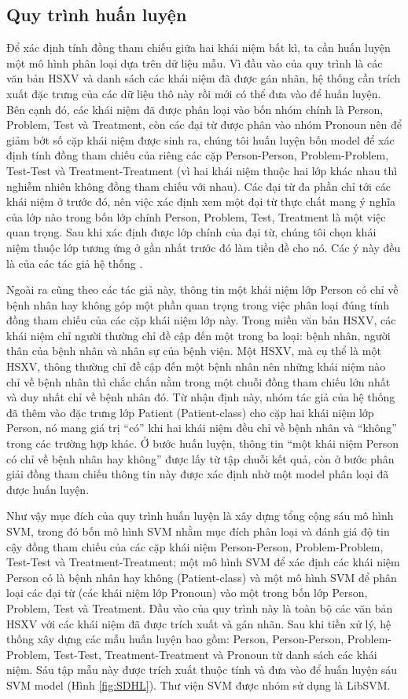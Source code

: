\subsection*{Quy trình huấn luyện}
Để xác định tính đồng tham chiếu giữa hai khái niệm bất kì, ta cần huấn luyện một mô hình phân loại dựa trên dữ liệu mẫu. Vì đầu vào của quy trình là các văn bản HSXV và danh sách các khái niệm đã được gán nhãn, hệ thống cần trích xuất đặc trưng của các dữ liệu thô này rồi mới có thể đưa vào để huấn luyện. Bên cạnh đó, các khái niệm đã được phân loại vào bốn nhóm chính là Person, Problem, Test và Treatment, còn các đại từ được phân vào nhóm Pronoun nên để giảm bớt số cặp khái niệm được sinh ra, chúng tôi huấn luyện bốn model để xác định tính đồng tham chiếu của riêng các cặp Person-Person, Problem-Problem, Test-Test và Treatment-Treatment (vì hai khái niệm thuộc hai lớp khác nhau thì nghiễm nhiên không đồng tham chiếu với nhau). Các đại từ đa phần chỉ tới các khái niệm ở trước đó, nên việc xác định xem một đại từ thực chất mang ý nghĩa của lớp nào trong bốn lớp chính Person, Problem, Test, Treatment là một việc quan trọng. Sau khi xác định được lớp chính của đại từ, chúng tôi chọn khái niệm thuộc lớp tương ứng ở gần nhất trước đó làm tiền đề cho nó. Các ý này đều là của các tác giả hệ thống \cite{YanXu2012}.

Ngoài ra cũng theo các tác giả này, thông tin một khái niệm lớp Person có chỉ về bệnh nhân hay không góp một phần quan trọng trong việc phân loại đúng tính đồng tham chiếu của các cặp khái niệm lớp này. Trong miền văn bản HSXV, các khái niệm chỉ người thường chỉ đề cập đến một trong ba loại: bệnh nhân, người thân của bệnh nhân và nhân sự của bệnh viện. Một HSXV, mà cụ thể là một HSXV, thông thường chỉ đề cập đến một bệnh nhân nên những khái niệm nào chỉ về bệnh nhân thì chắc chắn nằm trong một chuỗi đồng tham chiếu lớn nhất và duy nhất chỉ về bệnh nhân đó. Từ nhận định này, nhóm tác giả của hệ thống \cite{YanXu2012} đã thêm vào đặc trưng lớp Patient (Patient-class) cho cặp hai khái niệm lớp Person, nó mang giá trị ``có'' khi hai khái niệm đều chỉ về bệnh nhân và ``không'' trong các trường hợp khác. Ở bước huấn luyện, thông tin ``một khái niệm Person có chỉ về bệnh nhân hay không'' được lấy từ tập chuỗi kết quả, còn ở bước phân giải đồng tham chiếu thông tin này được xác định nhờ một model phân loại đã được huấn luyện.

Như vậy mục đích của quy trình huấn luyện là xây dựng tổng cộng sáu mô hình SVM, trong đó bốn mô hình SVM nhằm mục đích phân loại và đánh giá độ tin cậy đồng tham chiếu của các cặp khái niệm Person-Person, Problem-Problem, Test-Test và Treatment-Treatment; một mô hình SVM để xác định các khái niệm Person có là bệnh nhân hay không (Patient-class) và một mô hình SVM để phân loại các đại từ (các khái niệm lớp Pronoun) vào một trong bốn lớp Person, Problem, Test và Treatment. Đầu vào của quy trình này là toàn bộ các văn bản HSXV với các khái niệm đã được trích xuất và gán nhãn. Sau khi tiền xử lý, hệ thống xây dựng các mẫu huấn luyện bao gồm: Person, Person-Person, Problem-Problem, Test-Test, Treatment-Treatment và Pronoun từ danh sách các khái niệm. Sáu tập mẫu này được trích xuất thuộc tính và đưa vào để huấn luyện sáu SVM model (Hình \ref{fig:SDHL}). Thư viện SVM được nhóm sử dụng là LibSVM. 

